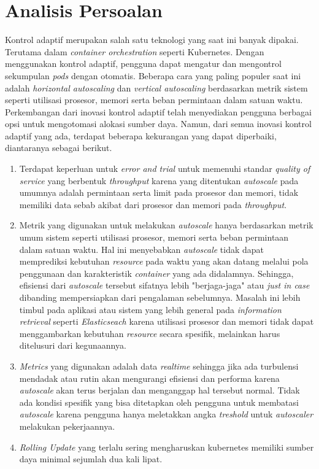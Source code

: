 \section{Analisis Persoalan}

Kontrol adaptif merupakan salah satu teknologi yang saat ini banyak dipakai. Terutama dalam \textit{container orchestration} seperti Kubernetes. Dengan menggunakan kontrol adaptif, pengguna dapat mengatur dan mengontrol sekumpulan \textit{pods} dengan otomatis. Beberapa cara yang paling populer saat ini adalah \textit{horizontal autoscaling} dan \textit{vertical autoscaling} berdasarkan metrik sistem seperti utilisasi prosesor, memori serta beban permintaan dalam satuan waktu. Perkembangan dari inovasi kontrol adaptif telah menyediakan pengguna berbagai opsi untuk mengotomasi alokasi sumber daya. Namun, dari semua inovasi kontrol adaptif yang ada, terdapat beberapa kekurangan yang dapat diperbaiki, diantaranya sebagai berikut.

\begin{enumerate}
    \item Terdapat keperluan untuk \textit{error and trial} untuk memenuhi standar \textit{quality of service} yang berbentuk \textit{throughput} karena yang ditentukan \textit{autoscale} pada umumnya adalah permintaan serta limit pada prosesor dan memori, tidak memiliki data sebab akibat dari prosesor dan memori pada \textit{throughput}.
    \item Metrik yang digunakan untuk melakukan \textit{autoscale} hanya berdasarkan metrik umum sistem seperti utilisasi prosesor, memori serta beban permintaan dalam satuan waktu. Hal ini menyebabkan \textit{autoscale} tidak dapat memprediksi kebutuhan \textit{resource} pada waktu yang akan datang melalui pola penggunaan dan karakteristik \textit{container} yang ada didalamnya. Sehingga, efisiensi dari \textit{autoscale} tersebut sifatnya lebih "berjaga-jaga" atau \textit{just in case} dibanding mempersiapkan dari pengalaman sebelumnya. Masalah ini lebih timbul pada aplikasi atau sistem yang lebih general pada \textit{information retrieval} seperti \textit{Elasticseach} karena utilisasi prosesor dan memori tidak dapat menggambarkan kebutuhan \textit{resource} secara spesifik, melainkan harus ditelusuri dari kegunaannya.
    \item \textit{Metrics} yang digunakan adalah data \textit{realtime} sehingga jika ada turbulensi mendadak atau rutin akan mengurangi efisiensi dan performa karena \textit{autoscale} akan terus berjalan dan menganggap hal tersebut normal. Tidak ada kondisi spesifik yang bisa ditetapkan oleh pengguna untuk membatasi \textit{autoscale} karena pengguna hanya meletakkan angka \textit{treshold} untuk \textit{autoscaler} melakukan pekerjaannya.
    \item \textit{Rolling Update} yang terlalu sering mengharuskan kubernetes memiliki sumber daya minimal sejumlah dua kali lipat.
\end{enumerate}

